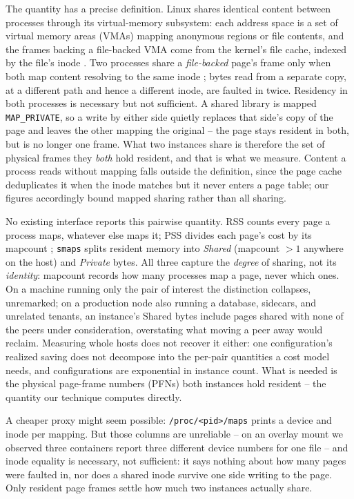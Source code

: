 \documentclass[sigplan,10pt,natbib=false]{acmart}
\newcommand{\procpath}[1]{\texttt{/proc/\allowbreak<pid>/\allowbreak#1}}
\begin{document}
The quantity has a precise definition. Linux shares identical content
between processes through its virtual-memory subsystem: each address
space is a set of virtual memory areas (VMAs) mapping anonymous
regions or file contents, and the frames backing a file-backed VMA
come from the kernel's file cache, indexed by the file's inode
\cite{mauerer2008linux}. Two processes share a \emph{file-backed}
page's frame only when both map content resolving to the same inode
\cite{inode}; bytes read from a separate copy, at a
different path and hence a different inode, are faulted in twice.
Residency in both processes is necessary but not sufficient. A shared
library is mapped \texttt{MAP\_PRIVATE}, so a write by either side
quietly replaces that side's copy of the page and leaves the other
mapping the original -- the page stays resident in both, but is no
longer one frame. What two instances share is therefore the set of
physical frames they \emph{both} hold resident, and that is what we
measure. Content a process reads without mapping falls outside the
definition, since the page cache deduplicates it when the inode
matches but it never enters a page table; our figures accordingly
bound mapped sharing rather than all sharing.

No existing interface reports this pairwise quantity. RSS counts every page a process
maps, whatever else maps it; PSS divides each page's cost by its
mapcount \cite{corbet2007pss}; \texttt{smaps} splits resident memory
into \emph{Shared} (mapcount $>1$ anywhere on the host) and
\emph{Private} bytes. All three capture the \emph{degree} of sharing,
not its \emph{identity}: mapcount records how many processes map a
page, never which ones. On a machine running only the pair of
interest the distinction collapses, unremarked; on a production node
also running a database, sidecars, and unrelated tenants, an
instance's Shared bytes include pages shared with none of the peers
under consideration, overstating what moving a peer away would
reclaim. Measuring whole hosts does not recover it either: one
configuration's realized saving does not decompose into the per-pair
quantities a cost model needs, and configurations are exponential in
instance count. What is needed is the physical page-frame numbers
(PFNs) both instances hold resident -- the quantity our technique
computes directly.

A cheaper proxy might seem possible: \procpath{maps} prints a
device and inode per mapping. But those columns are unreliable -- on
an overlay mount we observed three containers report three different
device numbers for one file -- and inode equality is necessary, not
sufficient: it says nothing about how many pages were faulted in, nor
does a shared inode survive one side writing to the page. Only
resident page frames settle how much two instances actually share.
\end{document}
